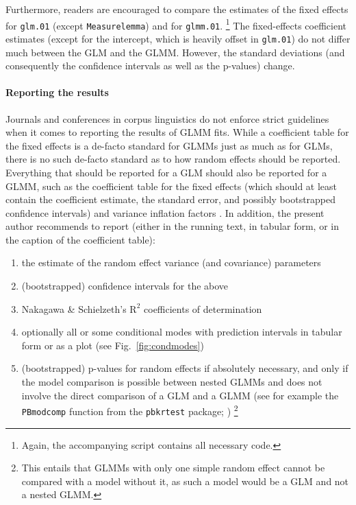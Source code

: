 Furthermore, readers are encouraged to compare the estimates of the fixed effects for \texttt{glm.01} (except \texttt{Measurelemma}) and for \texttt{glmm.01}.%
\footnote{Again, the accompanying script contains all necessary code.}
The fixed-effects coefficient estimates (except for the intercept, which is heavily offset in \texttt{glm.01}) do not differ much between the GLM and the GLMM.
However, the standard deviations (and consequently the confidence intervals as well as the p-values) change.

\paragraph{Reporting the results}

Journals and conferences in corpus linguistics do not enforce strict guidelines when it comes to reporting the results of GLMM fits.
While a coefficient table for the fixed effects is a de-facto standard for GLMMs just as much as for GLMs, there is no such de-facto standard as to how random effects should be reported.
Everything that should be reported for a GLM should also be reported for a GLMM, such as the coefficient table for the fixed effects (which should at least contain the coefficient estimate, the standard error, and possibly bootstrapped confidence intervals) and variance inflation factors \citep{FoxMonette1992,ZuurEa2010}.
In addition, the present author recommends to report (either in the running text, in tabular form, or in the caption of the coefficient table):

\begin{enumerate}
  \item the estimate of the random effect variance (and covariance) parameters
  \item (bootstrapped) confidence intervals for the above
  \item Nakagawa \& Schielzeth's $\textrm{R}^{\textrm{2}}$ coefficients of determination
  \item optionally all or some conditional modes with prediction intervals in tabular form or as a plot (see Fig.~\ref{fig:condmodes})
  \item (bootstrapped) p-values for random effects if absolutely necessary, and only if the model comparison is possible between nested GLMMs and does not involve the direct comparison of a GLM and a GLMM (see for example the \texttt{PBmodcomp} function from the \texttt{pbkrtest} package; \citealt{HalekohHojsgaard2014})%
    \footnote{This entails that GLMMs with only one simple random effect cannot be compared with a model without it, as such a model would be a GLM and not a nested GLMM.}
\end{enumerate}

